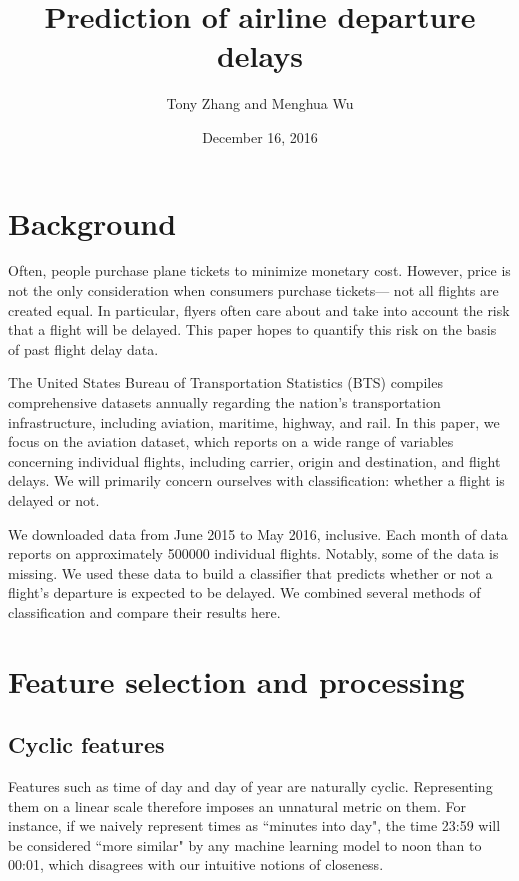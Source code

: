\documentclass{article}
\title{Prediction of airline departure delays}
\author{Tony Zhang and Menghua Wu}
\date{December 16, 2016}
\begin{document}
\maketitle

\begin{multicols}{2}


\section{Background}
\label{sec:bg}

Often, people purchase plane tickets
to minimize monetary cost.
However, price is not the only consideration
when consumers purchase tickets---
not all flights are created equal.
In particular,
flyers often care about and take into account
the risk that a flight will be delayed.
This paper hopes to quantify this risk
on the basis of past flight delay data.

The United States Bureau of Transportation Statistics (BTS)
compiles comprehensive datasets annually
regarding the nation's transportation infrastructure,
including aviation, maritime, highway, and rail.
In this paper, we focus on the aviation dataset,
which reports on a wide range of variables concerning individual flights,
including carrier, origin and destination, and flight delays.
We will primarily concern ourselves with classification:
whether a flight is delayed or not.

We downloaded data from June 2015 to May 2016, inclusive.
Each month of data reports on
approximately 500000 individual flights.
Notably, some of the data is missing.
We used these data to build a classifier
that predicts whether or not a flight's departure
is expected to be delayed.
We combined several methods of classification
and compare their results here.

\section{Feature selection and processing}


\subsection{Cyclic features}

Features such as time of day and day of year
are naturally cyclic.
Representing them on a linear scale
therefore imposes an unnatural metric on them.
For instance,
if we naively represent times as ``minutes into day",
the time 23:59 will be considered ``more similar"
by any machine learning model to noon than to 00:01,
which disagrees with our intuitive notions of closeness.


\end{multicols}
\end{document}
